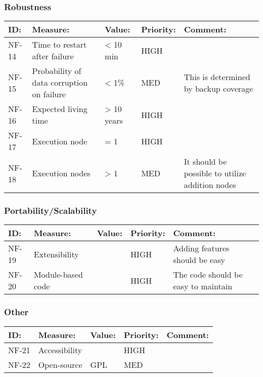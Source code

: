 \subsubsection{Robustness}

\begin{supertabular}{|l|p{5cm}|p{1.8cm}|l|p{4.4cm}|}
\hline
\textbf{ID:} & \textbf{Measure:} & \textbf{Value:} & \textbf{Priority:} & \textbf{Comment:}\\
\hline

NF-14 & Time to restart after failure & {\textless} 10 min & HIGH &
\\\hline

NF-15 & Probability of data corruption on failure & {\textless} 1\% & MED &
This is determined by backup coverage\\
\hline

NF-16 & Expected living time & {\textgreater} 10 years & HIGH & \\
\hline

NF-17 & Execution node & = 1  & HIGH &\\
\hline

NF-18 & Execution nodes & {\textgreater} 1 & MED & It should be possible to
utilize addition nodes\\
\hline
\end{supertabular}

\subsubsection{Portability/Scalability}

\begin{supertabular}{|l|p{5cm}|p{1.8cm}|l|p{4.4cm}|}
\hline
\textbf{ID:} & \textbf{Measure:} & \textbf{Value:} & \textbf{Priority:} & \textbf{Comment:}\\
\hline

NF-19 & Extensibility && HIGH & Adding features should be easy\\
\hline

NF-20 & Module-based code && HIGH & The code should be easy to maintain\\
\hline
\end{supertabular}

\subsubsection{Other}
\begin{supertabular}{|l|p{5cm}|p{1.8cm}|l|p{4.4cm}|}
\hline
\textbf{ID:} & \textbf{Measure:} & \textbf{Value:} & \textbf{Priority:} & \textbf{Comment:}\\
\hline

NF-21 & Accessibility & & HIGH & \\
\hline

NF-22 & Open-source & GPL & MED & \\
\hline
\end{supertabular}

